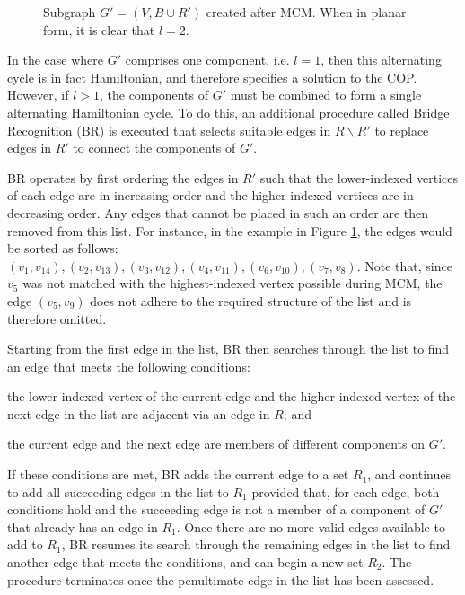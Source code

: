 \documentclass[runningheads]{llncs}
\begin{document}
\begin{figure}[H]	
	\centering
	\begin{subfigure}[h]{0.4\textwidth}
		
	\end{subfigure} \quad
	\begin{subfigure}[h]{0.56\textwidth}
		
	\end{subfigure}
	\caption{Subgraph $G'= (V, B \cup R')$ created after MCM. When in planar form, it is clear that $l = 2$.}
	\label{fig:mps}
\end{figure}

\noindent In the case where $G'$ comprises one component, i.e. $l = 1$, then this alternating cycle is in fact Hamiltonian, and therefore specifies a solution to the COP. However, if $l > 1$, the components of $G'$ must be combined to form a single alternating Hamiltonian cycle. To do this, an additional procedure called Bridge Recognition (BR) is executed that selects suitable edges in $R\backslash R'$ to replace edges in $R'$ to connect the components of $G'$.

BR operates by first ordering the edges in $R'$ such that the lower-indexed vertices of each edge are in increasing order and the higher-indexed vertices are in decreasing order. Any edges that cannot be placed in such an order are then removed from this list. For instance, in the example in Figure \ref{fig:mps}, the edges would be sorted as follows: $(v_1, v_{14}), (v_2, v_{13}),(v_3, v_{12}),(v_4, v_{11}),(v_6, v_{10}),(v_7, v_8)$. Note that, since $v_5$ was not matched with the highest-indexed vertex possible during MCM, the edge $(v_5, v_9)$ does not adhere to the required structure of the list and is therefore omitted.

Starting from the first edge in the list, BR then searches through the list to find an edge that meets the following conditions: 
\begin{enumerate*}[label={(\alph*)}]
	\item the lower-indexed vertex of the current edge and the higher-indexed vertex of the next edge in the list are adjacent via an edge in $R$; and
	\item the current edge and the next edge are members of different components on $G'$.
\end{enumerate*}
If these conditions are met, BR adds the current edge to a set $R_1$, and continues to add all succeeding edges in the list to $R_1$ provided that, for each edge, both conditions hold and the succeeding edge is not a member of a component of $G'$ that already has an edge in $R_1$. Once there are no more valid edges available to add to $R_1$, BR resumes its search through the remaining edges in the list to find another edge that meets the conditions, and can begin a new set $R_2$. The procedure terminates once the penultimate edge in the list has been assessed.
\end{document}
